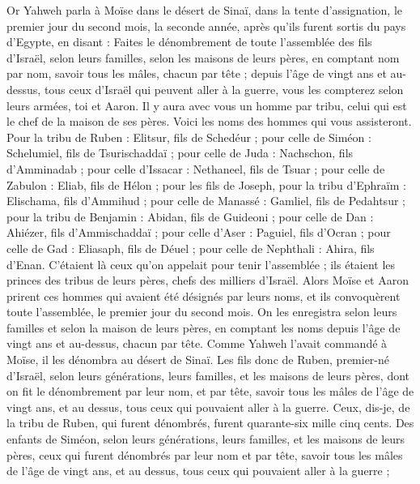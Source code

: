 \begin{multicols}{2}
\VerseOne{}Or Yahweh parla à Moïse dans le désert de Sinaï, dans la tente d'assignation, le premier jour du second mois, la seconde année, après qu'ils furent sortis du pays d'Egypte, en disant :
Faites le dénombrement de toute l'assemblée des fils d'Israël, selon leurs familles, selon les maisons de leurs pères, en comptant nom par nom, savoir tous les mâles, chacun par tête ;
depuis l'âge de vingt ans et au-dessus, tous ceux d'Israël qui peuvent aller à la guerre, vous les compterez selon leurs armées, toi et Aaron.
Il y aura avec vous un homme par tribu, celui qui est le chef de la maison de ses pères.
Voici les noms des hommes qui vous assisteront. Pour la tribu de Ruben : Elitsur, fils de Schedéur ;
pour celle de Siméon : Schelumiel, fils de Tsurischaddaï ;
pour celle de Juda : Nachschon, fils d'Amminadab ;
pour celle d'Issacar : Nethaneel, fils de Tsuar ;
pour celle de Zabulon : Eliab, fils de Hélon ;
pour les fils de Joseph, pour la tribu d'Ephraïm : Elischama, fils d'Ammihud ; pour celle de Manassé : Gamliel, fils de Pedahtsur ;
pour la tribu de Benjamin : Abidan, fils de Guideoni ;
pour celle de Dan : Ahiézer, fils d'Ammischaddaï ;
pour celle d'Aser : Paguiel, fils d'Ocran ;
pour celle de Gad : Eliasaph, fils de Déuel ;
pour celle de Nephthali : Ahira, fils d'Enan.
C'étaient là ceux qu'on appelait pour tenir l'assemblée ; ils étaient les princes des tribus de leurs pères, chefs des milliers d'Israël.
Alors Moïse et Aaron prirent ces hommes qui avaient été désignés par leurs noms,
et ils convoquèrent toute l'assemblée, le premier jour du second mois. On les enregistra selon leurs familles et selon la maison de leurs pères, en comptant les noms depuis l'âge de vingt ans et au-dessus, chacun par tête.
Comme Yahweh l'avait commandé à Moïse, il les dénombra au désert de Sinaï.
Les fils donc de Ruben, premier-né d'Israël, selon leurs générations, leurs familles, et les maisons de leurs pères, dont on fit le dénombrement par leur nom, et par tête, savoir tous les mâles de l'âge de vingt ans, et au dessus, tous ceux qui pouvaient aller à la guerre.
Ceux, dis-je, de la tribu de Ruben, qui furent dénombrés, furent quarante-six mille cinq cents.
Des enfants de Siméon, selon leurs générations, leurs familles, et les maisons de leurs pères, ceux qui furent dénombrés par leur nom et par tête, savoir tous les mâles de l'âge de vingt ans, et au dessus, tous ceux qui pouvaient aller à la guerre ;

\end{multicols}
